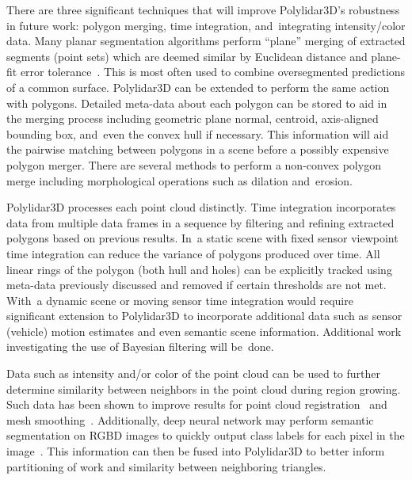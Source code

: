 There are three significant techniques that will improve Polylidar3D's robustness in future work: polygon merging, time integration, and~integrating intensity/color data. Many planar segmentation algorithms perform ``plane'' merging of extracted segments (point sets) which are deemed similar by Euclidean distance and plane-fit error tolerance~\cite{feng_fast_2014,oesau_planar_2016, trevor2013efficient, biswas_planar_2012}. This is most often used to combine oversegmented predictions of a common surface. Polylidar3D can be extended to perform the same action with polygons. Detailed meta-data about each polygon can be stored to aid in the merging process including geometric plane normal, centroid, axis-aligned bounding box, and~even the convex hull if necessary. This information will aid the pairwise matching between polygons in a scene before a possibly expensive polygon merger. There are several methods to perform a non-convex polygon merge including morphological operations such as dilation and~erosion.

Polylidar3D processes each point cloud distinctly. Time integration incorporates data from multiple data frames in a sequence by filtering and refining extracted polygons based on previous results. In~a static scene with fixed sensor viewpoint time integration can reduce the variance of polygons produced over time. All linear rings of the polygon (both hull and holes) can be explicitly tracked using meta-data previously discussed and removed if certain thresholds are not met.  With~a dynamic scene or moving sensor time integration would require significant extension to Polylidar3D to incorporate additional data such as sensor (vehicle) motion estimates and even semantic scene information. Additional work investigating the use of Bayesian filtering will be~done.

Data such as intensity and/or color of the point cloud can be used to further determine similarity between neighbors in the point cloud during region growing. Such data has been shown to improve results for point cloud registration~\cite{rusinkiewicz_efficient_2001} and mesh smoothing~\cite{lee_fast_2013}. Additionally, deep neural network may perform semantic segmentation on \ac{RGBD} images to quickly output class labels for each pixel in the image~\cite{pham_scenecut_2018}. This information can then be fused into Polylidar3D to better inform partitioning of work and similarity between neighboring triangles.

